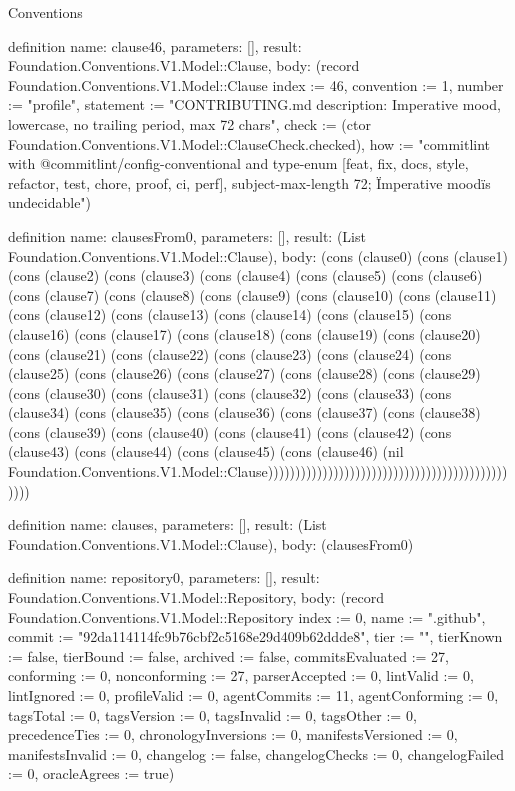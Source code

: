 \begin{lexlean}{Conventions}
\begin{semanticmodule}
definition{
  name: clause46,
  parameters: [],
  result: Foundation.Conventions.V1.Model::Clause,
  body: (record Foundation.Conventions.V1.Model::Clause {index := 46, convention := 1, number := "profile", statement := "CONTRIBUTING.md description: Imperative mood, lowercase, no trailing period, max 72 chars", check := (ctor Foundation.Conventions.V1.Model::ClauseCheck.checked), how := "commitlint with @commitlint/config-conventional and type-enum [feat, fix, docs, style, refactor, test, chore, proof, ci, perf], subject-max-length 72; \"Imperative mood\" is undecidable"})
}

definition{
  name: clausesFrom0,
  parameters: [],
  result: (List Foundation.Conventions.V1.Model::Clause),
  body: (cons (clause0) (cons (clause1) (cons (clause2) (cons (clause3) (cons (clause4) (cons (clause5) (cons (clause6) (cons (clause7) (cons (clause8) (cons (clause9) (cons (clause10) (cons (clause11) (cons (clause12) (cons (clause13) (cons (clause14) (cons (clause15) (cons (clause16) (cons (clause17) (cons (clause18) (cons (clause19) (cons (clause20) (cons (clause21) (cons (clause22) (cons (clause23) (cons (clause24) (cons (clause25) (cons (clause26) (cons (clause27) (cons (clause28) (cons (clause29) (cons (clause30) (cons (clause31) (cons (clause32) (cons (clause33) (cons (clause34) (cons (clause35) (cons (clause36) (cons (clause37) (cons (clause38) (cons (clause39) (cons (clause40) (cons (clause41) (cons (clause42) (cons (clause43) (cons (clause44) (cons (clause45) (cons (clause46) (nil Foundation.Conventions.V1.Model::Clause))))))))))))))))))))))))))))))))))))))))))))))))
}

definition{
  name: clauses,
  parameters: [],
  result: (List Foundation.Conventions.V1.Model::Clause),
  body: (clausesFrom0)
}

definition{
  name: repository0,
  parameters: [],
  result: Foundation.Conventions.V1.Model::Repository,
  body: (record Foundation.Conventions.V1.Model::Repository {index := 0, name := ".github", commit := "92da114114fc9b76cbf2c5168e29d409b62ddde8", tier := "", tierKnown := false, tierBound := false, archived := false, commitsEvaluated := 27, conforming := 0, nonconforming := 27, parserAccepted := 0, lintValid := 0, lintIgnored := 0, profileValid := 0, agentCommits := 11, agentConforming := 0, tagsTotal := 0, tagsVersion := 0, tagsInvalid := 0, tagsOther := 0, precedenceTies := 0, chronologyInversions := 0, manifestsVersioned := 0, manifestsInvalid := 0, changelog := false, changelogChecks := 0, changelogFailed := 0, oracleAgrees := true})
}


\end{semanticmodule}
\end{lexlean}

